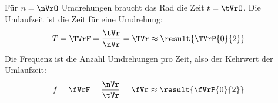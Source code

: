 Für $n = \nVrO$ Umdrehungen braucht das Rad die Zeit $t = \tVrO$. Die Umlaufzeit ist die Zeit für eine Umdrehung:
\begin{align}
 T &= \TVrF = \frac{\tVr}{\nVr} = \TVr \approx \result{\TVrP{0}{2}}
\end{align}
Die Frequenz ist die Anzahl Umdrehungen pro Zeit, also der Kehrwert der Umlaufzeit:
\begin{align}
 f &= \fVrF = \frac{\nVr}{\tVr} = \fVr \approx \result{\fVrP{0}{2}}
\end{align}
